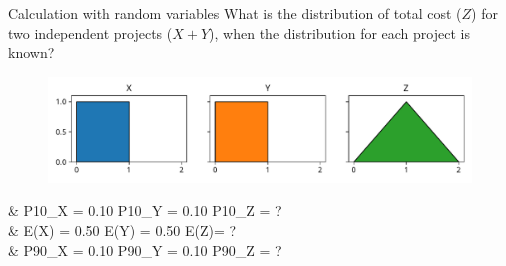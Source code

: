 \documentclass[12pt, aspectratio=149]{beamer}
\theoremstyle{plain}
\begin{document}
\begin{frame}[fragile]{Calculation with random variables}
	What is the distribution of total cost ($Z$) for two independent projects ($X + Y$), when the distribution for each project is known?
    \begin{center}
     \begin{figure}
     	\centering
     	\includegraphics[width=0.99\linewidth]{figures/add_uniform}
     \end{figure}
     \end{center}
	 \begin{flalign*}
     &\hspace*{1em} P10_X = 0.10 \hspace*{4em} P10_Y = 0.10 \hspace*{4em}  P10_Z = ? \\
	 &\hspace*{1em} E(X) = 0.50 \hspace*{4em}  E(Y) = 0.50 \hspace*{4em}  E(Z)= ? \\
     &\hspace*{1em} P90_X = 0.10 \hspace*{4em} P90_Y = 0.10 \hspace*{4em}  P90_Z = ? \\
	\end{flalign*}
\end{frame}
\end{document}
